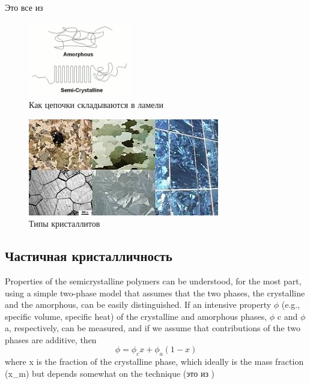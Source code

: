 Это все из \cite{cryst1}

	\begin{figure} 
\vspace{-20pt}


  \begin{center}
    \includegraphics[width=0.4\textwidth]{fig/crystal-1.png}
    \caption{Как цепочки складываются в ламели}
    \label{fig:crystal-1}
  \end{center}
  \vspace{-20pt}
  \vspace{1pt}
\end{figure}



\begin{figure}[h]
    \includegraphics[width=\textwidth]{fig/crystallites.jpg}
    \caption{Типы кристаллитов}
    \label{fig:crystallites}
\end{figure}



\subsection{Частичная кристалличность}
Properties of the semicrystalline polymers can be understood, for the most part,
using a simple two-phase model that assumes that the two phases, the crystalline and
the amorphous, can be easily distinguished. If an intensive property $\phi$ (e.g., specific
volume, specific heat) of the crystalline and amorphous phases, $\phi$ c and $\phi$a, respectively, can be measured, and if we assume that contributions of the two phases
are additive, then
\[ 
\phi = \phi_c x + \phi_a(1-x)
\]
where x is the fraction of the crystalline phase, which ideally is the mass fraction
(x\_m) but depends somewhat on the technique (это из \cite{cryst3})
	
